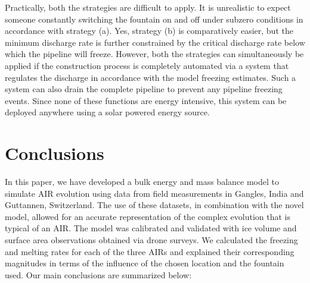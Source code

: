 \documentclass[utf8]{frontiersSCNS}
\begin{document}
Practically, both the strategies are difficult to apply. It is unrealistic to expect someone constantly
switching the fountain on and off under subzero conditions in accordance with strategy (a). Yes, strategy (b) is
comparatively easier, but the minimum discharge rate is further constrained by the critical discharge rate below
which the pipeline will freeze. However, both the strategies can simultaneously be applied if the construction
process is completely automated via a system that regulates the discharge in accordance with the model freezing
estimates. Such a system can also drain the complete pipeline to prevent any pipeline freezing events. Since
none of these functions are energy intensive, this system can be deployed anywhere using a solar powered energy
source.

\section{Conclusions}

In this paper, we have developed a bulk energy and mass balance model to simulate AIR evolution using data from
field measurements in Gangles, India and Guttannen, Switzerland. The use of these datasets, in combination with
the novel model, allowed for an accurate representation of the complex evolution that is typical of an AIR. The model was
calibrated and validated with ice volume and surface area observations obtained via drone surveys. We calculated
the freezing and melting rates for each of the three AIRs and explained their corresponding magnitudes in terms
of the influence of the chosen location and the fountain used. Our main conclusions are summarized below:
\end{document}
